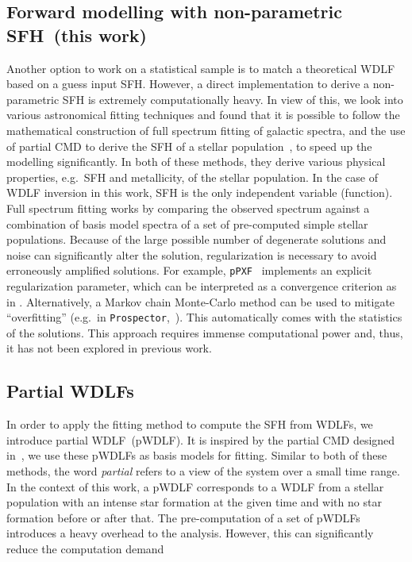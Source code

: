 \documentclass[fleqn,usenatbib]{mnras}
\begin{document}
\subsection{Forward modelling with non-parametric SFH~(this work)}
Another option to work on a statistical sample is to match a theoretical
WDLF based on a guess input SFH. However, a direct implementation to derive a
non-parametric SFH is extremely computationally heavy. In view of this, we look
into various astronomical fitting techniques and found that it is possible to
follow the mathematical construction of full spectrum fitting of galactic
spectra, and the use of partial CMD to derive the SFH of a stellar
population~\citep{2006A&A...459..783C}, to speed up the modelling significantly.
In both of these methods, they derive various physical properties, e.g.\ SFH and
metallicity, of the stellar population. In the case of WDLF inversion in this
work, SFH is the only independent variable (function). Full spectrum fitting
works by comparing the observed spectrum against a combination of basis model 
spectra of a set of pre-computed simple stellar populations. Because of the
large possible number of degenerate solutions and noise can significantly alter
the solution, regularization is necessary to avoid erroneously amplified
solutions. For example, \texttt{pPXF}~\citep{2023MNRAS.526.3273C} implements an 
explicit regularization  parameter, which can be interpreted as a convergence 
criterion as in  \citet{2013MNRAS.434.1549R}. Alternatively, a Markov chain
Monte-Carlo method can be used to mitigate ``overfitting'' (e.g.\ in 
\texttt{Prospector},~\citealp{2021ApJS..254...22J}). This automatically comes with
the statistics of the solutions. This approach requires immense computational
power and, thus, it has not been explored in previous work.

\subsection*{Partial WDLFs}
In order to apply the fitting method to compute the SFH from WDLFs, we introduce
partial WDLF~(pWDLF). It is inspired by the partial CMD designed
in~\citep{2006A&A...459..783C}, we use these pWDLFs as basis models
for fitting. Similar to both of these methods, the word \textit{partial} 
refers to a view of the system over a small time range. In the context of this
work, a pWDLF corresponds to a WDLF from a stellar population with an intense
star formation at the given time and with no star formation before or after
that. The pre-computation of a set of pWDLFs introduces a heavy overhead to the
analysis. However, this can significantly reduce the computation demand 
\end{document}
